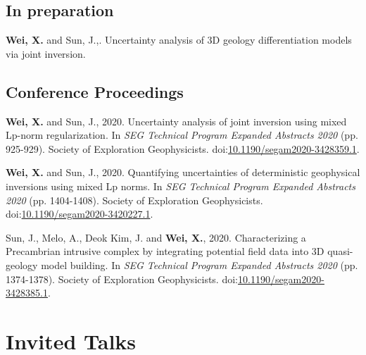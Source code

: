 \documentclass[11pt, a4paper]{article}
\newcommand{\LastName}{Wei}
\newcommand{\Initials}{X}
\newcommand{\Wei}{\textbf{\LastName, \Initials.}}  %
\newcommand{\WeiSun}{\textbf{\LastName, \Initials.} and Sun, J.}  %
\newcommand{\Revision}{under revision}
\newcommand{\DOI}[1]{doi:\href{https://doi.org/#1}{#1}}
\begin{document}
\subsection*{In preparation}
\begin{etaremune}
	
	\item
	\WeiSun,. Uncertainty analysis of 3D geology differentiation models via joint inversion. 
	
\end{etaremune}

\subsection*{Conference Proceedings}
\begin{etaremune}
	
	\item 
	\WeiSun, 2020. Uncertainty analysis of joint inversion using mixed Lp-norm regularization. In \emph{SEG Technical Program Expanded Abstracts 2020} (pp. 925-929). Society of Exploration Geophysicists. \DOI{10.1190/segam2020-3428359.1}.

	\item 
	\WeiSun, 2020. Quantifying uncertainties of deterministic geophysical inversions using mixed Lp norms. In \emph{SEG Technical Program Expanded Abstracts 2020} (pp. 1404-1408). Society of Exploration Geophysicists. \DOI{10.1190/segam2020-3420227.1}.
	
	\item 
	Sun, J., Melo, A., Deok Kim, J. and \Wei, 2020. Characterizing a Precambrian intrusive complex by integrating potential field data into 3D quasi-geology model building. In \emph{SEG Technical Program Expanded Abstracts 2020} (pp. 1374-1378). Society of Exploration Geophysicists. \DOI{10.1190/segam2020-3428385.1}.
		
\end{etaremune}


\section*{Invited Talks}
%	
%	
%	
%	
\end{document}
